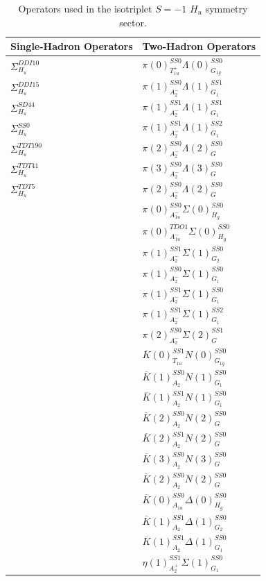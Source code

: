 \begin{table}[H]
    \centering
    \begin{tabular}{l|l}
        \textbf{Single-Hadron Operators} & \textbf{Two-Hadron Operators} \\
        \hline
        $\Sigma_{H_u}^{DDI10}$ & $\pi(0)_{T_{1u}^+}^{SS0}\Lambda(0)_{G_{1g}}^{SS0}$\\
        $\Sigma_{H_u}^{DDI15}$ & $\pi(1)_{A_2^-}^{SS0}\Lambda(1)_{G_1}^{SS1}$\\
        $\Sigma_{H_u}^{SD44}$ & $\pi(1)_{A_2^-}^{SS1}\Lambda(1)_{G_1}^{SS1}$\\
        $\Sigma_{H_u}^{SS0}$ & $\pi(1)_{A_2^-}^{SS1}\Lambda(1)_{G_1}^{SS2}$\\
        $\Sigma_{H_u}^{TDT190}$ & $\pi(2)_{A_2^-}^{SS0}\Lambda(2)_{G}^{SS0}$\\
        $\Sigma_{H_u}^{TDT41}$ & $\pi(3)_{A_2^-}^{SS0}\Lambda(3)_{G}^{SS0}$\\
        $\Sigma_{H_u}^{TDT5}$ & $\pi(2)_{A_2^-}^{SS0}\Lambda(2)_{G}^{SS0}$\\
        & $\pi(0)_{A_{1u}^-}^{SS0}\Sigma(0)_{H_g}^{SS0}$\\
        & $\pi(0)_{A_{1u}^-}^{TDO1}\Sigma(0)_{H_g}^{SS0}$\\
        & $\pi(1)_{A_2^-}^{SS1}\Sigma(1)_{G_2}^{SS0}$\\
        & $\pi(1)_{A_2^-}^{SS0}\Sigma(1)_{G_1}^{SS0}$\\
        & $\pi(1)_{A_2^-}^{SS1}\Sigma(1)_{G_1}^{SS0}$\\
        & $\pi(1)_{A_2^-}^{SS1}\Sigma(1)_{G_1}^{SS2}$\\
        & $\pi(2)_{A_2^-}^{SS0}\Sigma(2)_{G}^{SS1}$\\
        & $\overline K(0)_{T_{1u}}^{SS1}N(0)_{G_{1g}}^{SS0}$\\
        & $\overline K(1)_{A_2}^{SS0}N(1)_{G_1}^{SS0}$\\
        & $\overline K(1)_{A_2}^{SS1}N(1)_{G_1}^{SS0}$\\
        & $\overline K(2)_{A_2}^{SS0}N(2)_{G}^{SS0}$\\
        & $\overline K(2)_{A_2}^{SS1}N(2)_{G}^{SS0}$\\
        & $\overline K(3)_{A_2}^{SS0}N(3)_{G}^{SS0}$\\
        & $\overline K(2)_{A_2}^{SS0}N(2)_{G}^{SS0}$\\
        & $\overline K(0)_{A_{1u}}^{SS0}\Delta(0)_{H_g}^{SS0}$\\
        & $\overline K(1)_{A_2}^{SS1}\Delta(1)_{G_2}^{SS0}$\\
        & $\overline K(1)_{A_2}^{SS1}\Delta(1)_{G_1}^{SS0}$\\
        & $\eta(1)_{A_2^+}^{SS1}\Sigma(1)_{G_1}^{SS0}$
    \end{tabular}
    \caption{Operators used in the isotriplet $S=-1$ $H_u$ symmetry sector.}\label{table:hu_ops}
\end{table}

